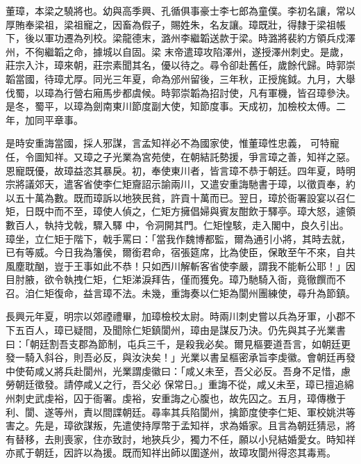 \begin{pinyinscope}
 董璋，本梁之驍將也。幼與高季興、孔循俱事豪士李七郎為童僕。李初名讓，常以厚賄奉梁祖，梁祖寵之，因畜為假子，賜姓朱，名友讓。璋既壯，得隸于梁祖帳下，後以軍功遷為列校。梁龍德末，潞州李繼韜送款于梁。時潞將裴約方領兵戍澤州，不徇繼韜之命，據城以自固。梁
 末帝遣璋攻陷澤州，遂授澤州刺史。是歲，莊宗入汴，璋來朝，莊宗素聞其名，優以待之。尋令卻赴舊任，歲餘代歸。時郭崇韜當國，待璋尤厚。同光三年夏，命為邠州留後，三年秋，正授旄鉞。九月，大舉伐蜀，以璋為行營右廂馬步都虞候。時郭崇韜為招討使，凡有軍機，皆召璋參決。是冬，蜀平，以璋為劍南東川節度副大使，知節度事。天成初，加檢校太傅。二年，加同平章事。



 是時安重誨當國，採人邪謀，言孟知祥必不為國家使，惟董璋性忠義，
 可特寵任，令圖知祥。又璋之子光業為宮苑使，在朝結託勢援，爭言璋之善，知祥之惡。恩寵既優，故璋益恣其暴戾。初，奉使東川者，皆言璋不恭于朝廷。四年夏，時明宗將議郊天，遣客省使李仁矩齎詔示諭兩川，又遣安重誨馳書于璋，以徵貢奉，約以五十萬為數。既而璋訴以地狹民貧，許貢十萬而已。翌日，璋於衙署設宴以召仁矩，日既中而不至，璋使人偵之，仁矩方擁倡婦與賓友酣飲于驛亭。璋大怒，遽領數百人，執持戈戟，驟入驛
 中，令洞開其門。仁矩惶駭，走入閣中，良久引出。璋坐，立仁矩于階下，戟手罵曰：「當我作魏博都監，爾為通引小將，其時去就，已有等威。今日我為籓侯，爾銜君命，宿張筵席，比為使臣，保敢至午不來，自共風塵耽酗，豈于王事如此不恭！只如西川解斬客省使李嚴，謂我不能斬公耶！」因目肘腋，欲令執拽仁矩，仁矩涕淚拜告，僅而獲免。璋乃馳騎入衙，竟徹饌而不召。洎仁矩復命，益言璋不法。未幾，重誨奏以仁矩為閬州團練使，尋升為節鎮。



 長興元年夏，明宗以郊禋禮畢，加璋檢校太尉。時兩川刺史嘗以兵為牙軍，小郡不下五百人，璋已疑間，及聞除仁矩鎮閬州，璋由是謀反乃決。仍先與其子光業書曰：「朝廷割吾支郡為節制，屯兵三千，是殺我必矣。爾見樞要道吾言，如朝廷更發一騎入斜谷，則吾必反，與汝決矣！」光業以書呈樞密承旨李虔徽。會朝廷再發中使荀咸乂將兵赴閬州，光業謂虔徽曰：「咸乂未至，吾父必反。吾身不足惜，慮勞朝廷徵發。請停咸乂之行，吾父必
 保常日。」重誨不從，咸乂未至，璋已擅追綿州刺史武虔裕，囚于衙署。虔裕，安重誨之心腹也，故先囚之。五月，璋傳檄于利、閬、遂等州，責以間諜朝廷。尋率其兵陷閬州，擒節度使李仁矩、軍校姚洪等害之。先是，璋欲謀叛，先遣使持厚幣于孟知祥，求為婚家。且言為朝廷猜忌，將有替移，去則喪家，住亦致討，地狹兵少，獨力不任，願以小兒結婚愛女。時知祥亦貳于朝廷，因許以為援。既而知祥出師以圍遂州，故璋攻閬州得恣其毒焉。




\end{pinyinscope}
